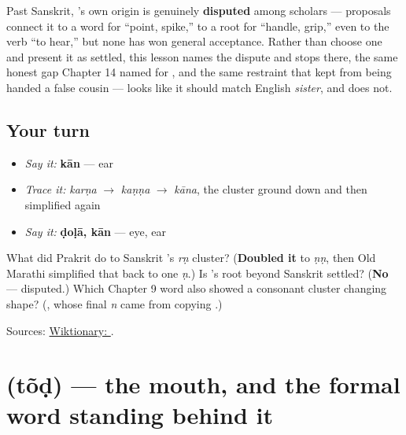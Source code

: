 \begin{cousinweb}
Past Sanskrit, \textbf{}'s own origin is genuinely \textbf{disputed} among scholars — proposals connect it to a word for \textquotedblleft{}point, spike,\textquotedblright{} to a root for \textquotedblleft{}handle, grip,\textquotedblright{} even to the verb \textquotedblleft{}to hear,\textquotedblright{} but none has won general acceptance. Rather than choose one and present it as settled, this lesson names the dispute and stops there, the same honest gap Chapter 14 named for \textbf{}, and the same restraint that kept \textbf{} from being handed a false cousin — \textbf{} looks like it should match English \emph{sister}, and does not.
\end{cousinweb}

\subsection*{Your turn}
\begin{itemize}
\raggedright
  \item \emph{Say it:} \textbf{kān} — ear
  \item \emph{Trace it:} \emph{karṇa} $\to$ \emph{kaṇṇa} $\to$ \emph{kāna}, the cluster ground down and then simplified again
  \item \emph{Say it:} \textbf{ḍoḷā, kān} — eye, ear
\end{itemize}

\begin{tcolorbox}[breakable,colback=teal!4,colframe=teal!35!black,title={Before you move on}]
What did Prakrit do to Sanskrit \textbf{}'s \emph{rṇ} cluster? (\textbf{Doubled it} to \emph{ṇṇ}, then Old Marathi simplified that back to one \emph{ṇ}.) Is \textbf{}'s root beyond Sanskrit settled? (\textbf{No} — disputed.) Which Chapter 9 word also showed a consonant cluster changing shape? (\textbf{}, whose final \emph{n} came from copying \textbf{}.)

Sources: \href{https://en.wiktionary.org/wiki/\%E0\%A4\%95\%E0\%A4\%BE\%E0\%A4\%A8}{Wiktionary: }.
\end{tcolorbox}
\section[tõḍ]{ (tõḍ) — the mouth, and the formal word standing behind it}

\label{lesson:MR-C12-tond}



